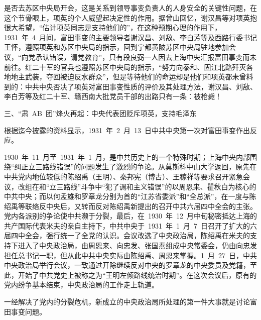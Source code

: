 是否去苏区中央局开会，这是关系到领导事变负责人的人身安全的关键性问题，在这个节骨眼上，项英的个人威望起决定性的作用。据曾山回忆，谢汉昌等对项英抱很大希望，“估计项英同志是支持他们的”，在这种预期心理的作用下，1931~年~4~月间，富田事变的主要领导者谢汉昌、刘敌、李白芳等及西路行委书记王怀，遵照项英和苏区中央局的指示，回到宁都黄陂苏区中央局驻地参加会议，“向党承认错误，请党教育”，只有段良弼一人因去上海中央汇报富田事变而未前往。红二十军的官兵也遵照苏区中央局的指示，“努力向泰和、固江北路歼灭各地地主武装，夺回被迫反水群众”，但是等待他们的命运却是他们和项英都未曾料到的：中共中央否决了项英对富田事变性质的评价及其处理方法，谢汉昌、刘敌、李白芳等及红二十军、赣西南大批党员干部的出路只有一条：被枪毙！

三、“肃~AB~团”烽火再起：中央代表团贬斥项英，支持毛泽东

根据迄今披露的资料显示，1931~年~2~月~13~日中共中央第一次对富田事变作出反应。

1930~年~11~月至~1931~年~1~月，是中共历史上的一个特殊时期；上海中央内部围绕“纠正立三路线错误”的问题发生了激烈的争论。从莫斯科中山大学返回，原先在中共党内地位较低的陈绍禹（王明）、秦邦宪（博古）、王稼祥等要求召开紧急会议，改组在和“立三路线”斗争中“犯了调和主义错误”的以周恩来、瞿秋白为核心的中共中央；而以何孟雄和罗章龙分别为首的“江苏省委派”和“全总派”，在一度与陈绍禹等联络反中央后，又转而反对陈绍禹新提出的召开中共六届四中全会的主张。党内各派别的争论使中共濒于分裂，最后，在~1930~年~12~月中旬秘密抵达上海的共产国际代表米夫的亲自主持下，中共中央于~1931~年~1~月~7~日召开了扩大的六届四中全会，强行统一了全党的认识。会议改选了中央政治局，陈绍禹在米夫的支持下进入了中央政治局，由周恩来、向忠发、张国焘组成中央常委会，仍由向忠发担任总书记一职，但从此中共中央实际由陈绍禹、周恩来掌握。1~月~27~日，中共中央政治局举行会议，一致通过开除继续反对中央的罗章龙的中央委员及党籍，至此，开始了中共党史上被称之为“王明左倾路线统治时期”。在这次会议后，原有的党内纷争基本结束，中央政治局的工作走上轨道。

一经解决了党内的分裂危机，新成立的中央政治局所处理的第一件大事就是讨论富田事变问题。


